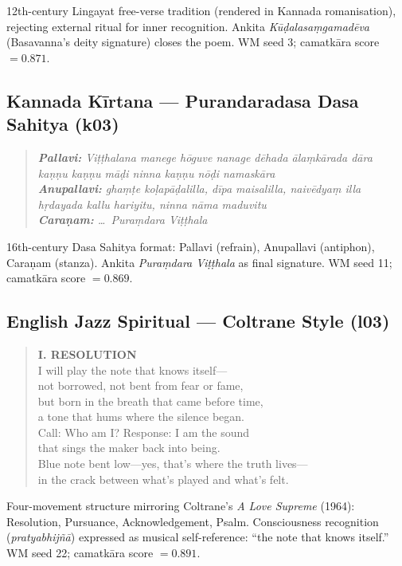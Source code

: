 \documentclass[journal,onecolumn,11pt]{IEEEtran}
\begin{document}
12th-century Lingayat free-verse tradition (rendered in Kannada romanisation),
rejecting external ritual for inner recognition.
Ankita \emph{Kūḍalasaṃgamadēva} (Basavanna's deity signature) closes the poem.
WM seed 3; camatkāra score $= 0.871$.

\subsection{Kannada Kīrtana --- Purandaradasa Dasa Sahitya (k03)}\label{sec:k03}

\begin{quote}
\small\itshape
\textbf{Pallavi:} Viṭṭhalana manege hōguve nanage dēhada ālaṃkārada dāra \\
kaṇṇu kaṇṇu māḍi ninna kaṇṇu nōḍi namaskāra \\[2pt]
\textbf{Anupallavi:} ghaṃṭe koḷapāḍalilla, dīpa maisalilla, naivēdyaṃ illa \\
hṛdayada kallu hariyitu, ninna nāma maduvitu \\[2pt]
\textbf{Caraṇam:} \ldots\ Puraṃdara Viṭṭhala
\end{quote}

16th-century Dasa Sahitya format: Pallavi (refrain), Anupallavi (antiphon),
Caraṇam (stanza). Ankita \emph{Puraṃdara Viṭṭhala} as final signature.
WM seed 11; camatkāra score $= 0.869$.

\subsection{English Jazz Spiritual — Coltrane Style (l03)}\label{sec:l03}

\begin{quote}
\textrm{\small
\textbf{I. RESOLUTION}\\
I will play the note that knows itself—\\
not borrowed, not bent from fear or fame,\\
but born in the breath that came before time,\\
a tone that hums where the silence began.\\
Call: Who am I? \quad Response: I am the sound\\
that sings the maker back into being.\\
Blue note bent low—yes, that's where the truth lives—\\
in the crack between what's played and what's felt.
}
\end{quote}

Four-movement structure mirroring Coltrane's \emph{A Love Supreme} (1964):
Resolution, Pursuance, Acknowledgement, Psalm.
Consciousness recognition (\emph{pratyabhijñā}) expressed as musical self-reference:
``the note that knows itself.''
WM seed 22; camatkāra score $= 0.891$.
\end{document}
